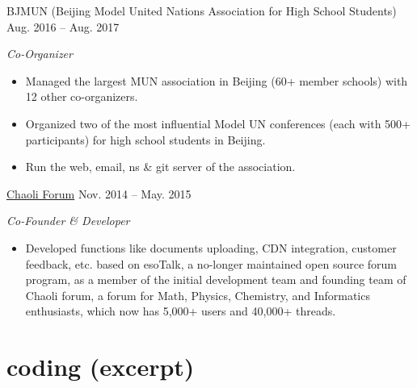 \documentclass[hidelinks__VERSION__]{adamyi-cv}
\begin{document}
\begin{entrylist}

\entry
{BJMUN (Beijing Model United Nations Association for High School Students)}
{Aug. 2016 -- Aug. 2017}
{\emph{Co-Organizer}
\begin{itemize}
\item Managed the largest MUN association in Beijing (60+ member schools) with 12 other co-organizers.
\item Organized two of the most influential Model UN conferences (each with 500+ participants) for high school students in Beijing.
\item Run the web, email, ns \& git server of the association.
\end{itemize}}


\entry
{\href{https://chaoli.club}{Chaoli Forum}}
{Nov. 2014 -- May. 2015}
{\emph{Co-Founder \& Developer}
\begin{itemize}
\item Developed functions like documents uploading, CDN integration, customer feedback, etc. based on esoTalk, a no-longer maintained open source forum program, as a member of the initial development team and founding team of Chaoli forum, a forum for Math, Physics, Chemistry, and Informatics enthusiasts, which now has 5,000+ users and 40,000+ threads.
\end{itemize}}


\end{entrylist}


\section{coding (excerpt)}
\end{document}
